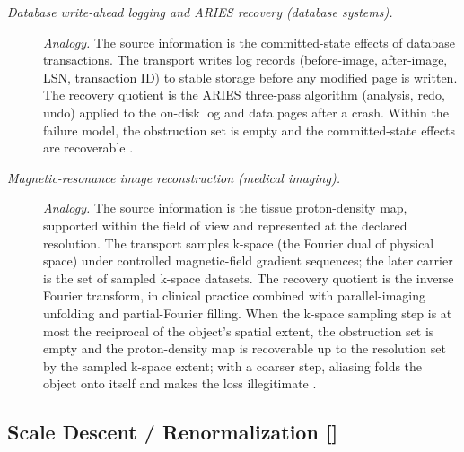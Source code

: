 \begin{description}
\item[\emph{Database write-ahead logging and {ARIES}
recovery (database systems).}] \textit{Analogy.}
The source information is the committed-state effects
of database transactions.  The transport writes log
records (before-image, after-image, LSN, transaction
ID) to stable storage before any modified page is
written.  The recovery quotient is the ARIES
three-pass algorithm (analysis, redo, undo) applied
to the on-disk log and data pages after a crash.
Within the failure model, the obstruction set is
empty and the committed-state effects are recoverable
\citep{Mohan1992ARIES}.

\item[\emph{Magnetic-resonance image reconstruction
(medical imaging).}] \textit{Analogy.}
The source information is the tissue proton-density
map, supported within the field of view and represented at the
declared resolution.  The transport
samples k-space (the Fourier dual of physical space)
under controlled magnetic-field gradient sequences;
the later carrier is the set of sampled k-space
datasets.  The recovery quotient is the inverse
Fourier transform, in clinical practice combined with
parallel-imaging unfolding and partial-Fourier
filling.  When the k-space sampling step is at most the reciprocal of the
object's spatial extent, the obstruction set is empty and the
proton-density map is recoverable up to the resolution set by the
sampled k-space extent; with a coarser step, aliasing folds the
object onto itself and makes the loss illegitimate
\citep{Lauterbur1973MRI}.
\end{description}
\endgroup

\subsection{Scale Descent / Renormalization [\texorpdfstring{}{F35}]}\label{sec:self-reference-limits:scale-descent}

